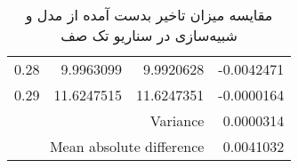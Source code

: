 \begin{table}
\begin{latin}
\begin{tabular}{rrrr}
			0.28                     & 9.9963099                                  & 9.9920628                                     & -0.0042471                \\
			0.29                     & 11.6247515                                 & 11.6247351                                    & -0.0000164                \\ \hline
			\multicolumn{3}{r}{Variance}                                                                                          & 0.0000314                 \\
			\multicolumn{3}{r}{Mean absolute difference}                                                                          & 0.0041032                 \\ \hline
		\end{tabular}
	\end{latin}
	\caption{مقایسه میزان تاخیر بدست آمده از مدل و شبیه‌سازی در سناریو تک صف}
	\label{table:scenario1}
\end{table}

